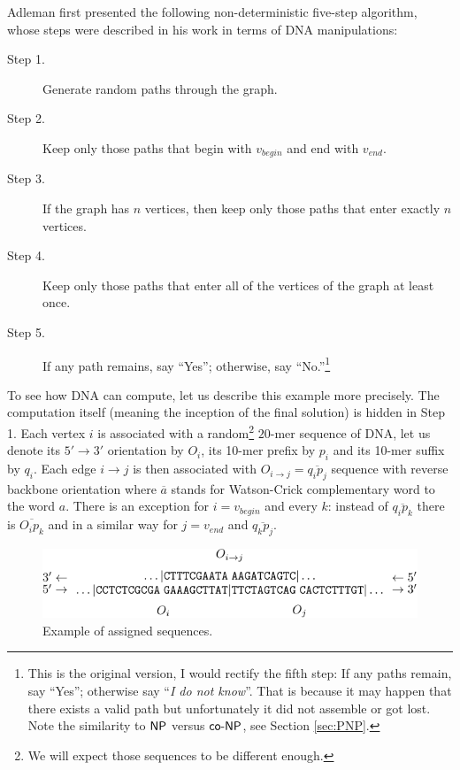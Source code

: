 		Adleman first presented the following non-deterministic five-step algorithm, whose steps were described in his work in terms of DNA manipulations:
		\begin{description}
			\item[Step 1.] Generate random paths through the graph.
			\item[Step 2.] Keep only those paths that begin with $v_{begin}$ and end with $v_{end}$.
			\item[Step 3.] If the graph has $n$ vertices, then keep only those paths that enter exactly $n$ vertices.
			\item[Step 4.] Keep only those paths that enter all of the vertices of the graph at least once.
			\item[Step 5.] If any path remains, say ``Yes''; otherwise, say ``No.''\footnote{This is the original version, I would rectify the fifth step: If any paths remain, say ``Yes''; otherwise say ``{\em I do not know}''. That is because it may happen that there exists a valid path but unfortunately it did not assemble or got lost. Note the similarity to $\mathsf{NP}$ versus $\mathsf{co}\textnormal{-}\mathsf{NP}$, see Section \ref{sec:PNP}.}
		\end{description}
		To see %
		how DNA can compute, let us describe this example more precisely. The computation itself (meaning the inception of the final solution) is hidden in Step 1. Each vertex $i$ is associated with a random\footnote{We will expect those sequences to be different enough.} $20$-mer sequence of DNA, let us denote its $5'\rightarrow 3'$ orientation by $O_i$, its 10-mer prefix by $p_i$ and its 10-mer suffix by $q_i$. Each edge $i\rightarrow j$ is then associated with $O_{i\rightarrow j} = \overline{q_i p_j}$ sequence with reverse backbone orientation where $\overline{a}$ stands for Watson-Crick complementary word to the word $a$. There is an exception for $i=v_{begin}$ and every $k$: instead of $\overline{q_i p_k}$ there is $\overline{O_i p_k}$ and in a similar way for $j=v_{end}$ and $\overline{q_k p_j}$.
		
		\begin{figure}[H]
		\begin{center}
			\includegraphics{./figures/adleman_strands.pdf}
			\caption{Example of assigned sequences.}
			\label{fig:adleman_strands}
		\end{center}
		\end{figure}
		
